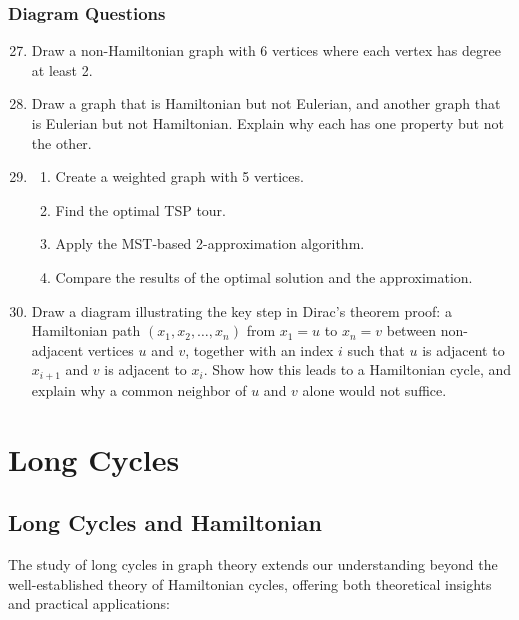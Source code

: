\documentclass{article}
\theoremstyle{definition}
\begin{document}
\subsubsection{Diagram Questions}
\begin{enumerate}\setcounter{enumi}{26}
\item Draw a non-Hamiltonian graph with 6 vertices where each vertex has degree at least 2.

\item Draw a graph that is Hamiltonian but not Eulerian, and another graph that is Eulerian but not Hamiltonian. Explain why each has one property but not the other.

\item 
\begin{enumerate}
\item Create a weighted graph with 5 vertices.
\item Find the optimal TSP tour.
\item Apply the MST-based 2-approximation algorithm.
\item Compare the results of the optimal solution and the approximation.
\end{enumerate}

\item Draw a diagram illustrating the key step in Dirac's theorem proof: a Hamiltonian path $(x_1, x_2, \ldots, x_n)$ from $x_1 = u$ to $x_n = v$ between non-adjacent vertices $u$ and $v$, together with an index $i$ such that $u$ is adjacent to $x_{i+1}$ and $v$ is adjacent to $x_i$. Show how this leads to a Hamiltonian cycle, and explain why a common neighbor of $u$ and $v$ alone would not suffice.
\end{enumerate}

\pagebreak


\section{Long Cycles}

\subsection{Long Cycles and Hamiltonian}


The study of long cycles in graph theory extends our understanding beyond the well-established theory of Hamiltonian cycles, offering both theoretical insights and practical applications:
\end{document}
